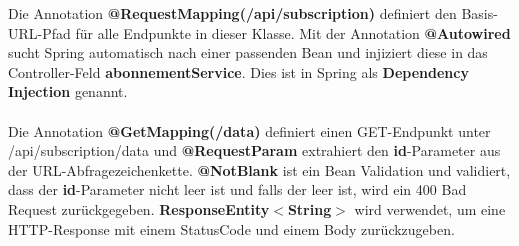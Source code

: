 \documentclass[a4paper,12pt]{scrreprt}
\begin{document}
Die Annotation \textbf{@RequestMapping(/api/subscription)} definiert den Basis-URL-Pfad für alle Endpunkte in dieser Klasse.
Mit der Annotation \textbf{@Autowired} sucht Spring automatisch nach einer passenden Bean und injiziert diese in das Controller-Feld \textbf{abonnementService}. Dies ist in Spring als \textbf{Dependency Injection} genannt.\\ \\
Die Annotation \textbf{@GetMapping(/data)} definiert einen GET-Endpunkt unter /api/subscription/data und \textbf{@RequestParam} extrahiert den \textbf{id}-Parameter aus der URL-Abfragezeichenkette. \textbf{@NotBlank} ist ein Bean Validation und validiert, dass der \textbf{id}-Parameter nicht leer ist und falls der leer ist, wird ein 400 Bad Request zurückgegeben. \textbf{ResponseEntity$<$String$>$} wird verwendet, um eine HTTP-Response mit einem StatusCode und einem Body zurückzugeben.
	
\end{document}
